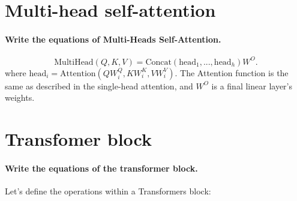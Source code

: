 \section{Multi-head self-attention}

\paragraph{Write the equations of Multi-Heads Self-Attention.}
\[
    \text{MultiHead}(Q, K, V) = \text{Concat}(\text{head}_1, ..., \text{head}_h)W^O
    .\]
where $\text{head}_i = \text{Attention}(QW_i^Q, KW_i^K, VW_i^V)$. The Attention function is the same as described in the single-head attention, and $W^O$ is a final linear layer's weights.

\section{Transfomer block}

\paragraph{Write the equations of the transformer block.}
Let's define the operations within a Transformers block:

